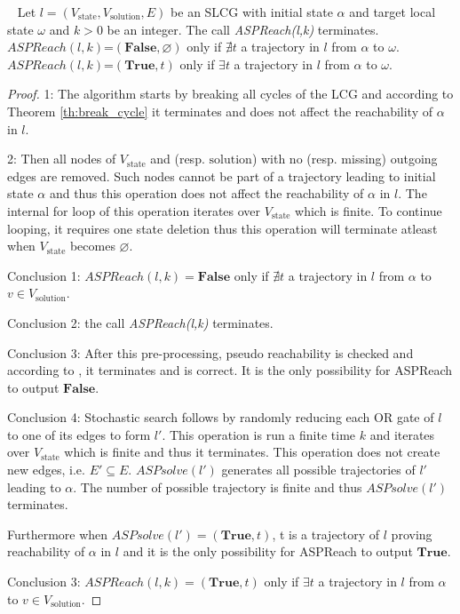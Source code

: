 \begin{theorem} ~
    Let $l=(V_{\mathrm{state}}, V_{\mathrm{solution}}, E)$ be an SLCG with initial state $\alpha$ and target local state $\omega$ and $k > 0$ be an integer.
    The call \textit{ASPReach(l,k)} terminates.\\
    $ASPReach(l,k)$=$(\mathbf{False},\varnothing)$ only if $\nexists t$ a trajectory in $l$ from $\alpha$ to $\omega$.\\
    $ASPReach(l,k)$=$(\mathbf{True},t)$ only if $\exists t$ a trajectory in $l$ from $\alpha$ to $\omega$.
    \begin{proof}
    
        1: The algorithm starts by breaking all cycles of the LCG and according to Theorem \ref{th:break_cycle} it terminates and does not affect the reachability of $\alpha$ in $l$.
        
        2: Then all nodes of $V_{\mathrm{state}}$ and (resp. ${\mathrm{solution}}$) with no (resp. missing) outgoing edges are removed.
        Such nodes cannot be part of a trajectory leading to initial state $\alpha$ and thus this operation does not affect the reachability of $\alpha$ in $l$.
        The internal for loop of this operation iterates over $V_{\mathrm{state}}$ which is finite.
        To continue looping, it requires one state deletion thus this operation will terminate atleast when $V_{\mathrm{state}}$ becomes $\varnothing$.
        
        Conclusion 1: $ASPReach(l,k)=\mathbf{False}$ only if $\nexists t$ a trajectory in $l$ from $\alpha$ to $v \in V_{\mathrm{solution}}$.
        
        Conclusion 2: the call \textit{ASPReach(l,k)} terminates.
        
        Conclusion 3: After this pre-processing, pseudo reachability is checked and according to \cite{pauleve2012}, it terminates and is correct.
        It is the only possibility for ASPReach to output $\mathbf{False}$.
        
        Conclusion 4: Stochastic search follows by randomly reducing each OR gate of $l$ to one of its edges to form $l'$.
        This operation is run a finite time $k$ and iterates over $V_{\mathrm{state}}$ which is finite and thus it terminates.
        This operation does not create new edges, i.e. $E' \subseteq E$.
        $ASPsolve(l')$ generates all possible trajectories of $l'$ leading to $\alpha$.
        The number of possible trajectory is finite and thus $ASPsolve(l')$ terminates.
        
        
        
        Furthermore when $ASPsolve(l')=(\mathbf{True},t)$, t is a trajectory of $l$ proving reachability of $\alpha$ in $l$ and it is the only possibility for ASPReach to output $\mathbf{True}$.
        
        Conclusion 3: $ASPReach(l,k)=(\mathrm{\mathbf{True}},t)$ only if $\exists t$ a trajectory in $l$ from $\alpha$ to $v \in V_{\mathrm{solution}}$.
    \end{proof}
\end{theorem}

